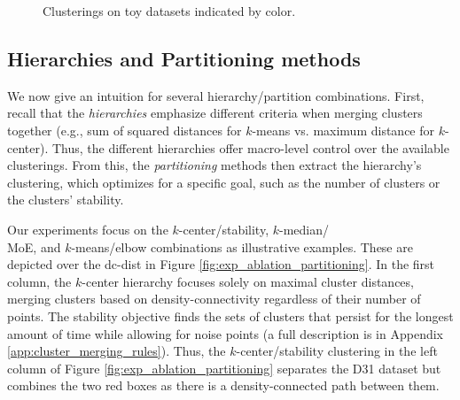 \begin{figure}[t]
    \centering
    \caption{Clusterings on toy datasets indicated by color.}
    \label{fig:exp_adapt}
\end{figure}



\subsection{Hierarchies and Partitioning methods}\label{ssec:partitioning}


We now give an intuition for several hierarchy/partition combinations. First, recall that the \emph{hierarchies} emphasize different criteria when merging clusters together (e.g., sum of squared distances for $k$-means vs. maximum distance for $k$-center). Thus, the different hierarchies offer macro-level control over the available clusterings. From this, the \textit{partitioning} methods then extract the hierarchy's clustering, which optimizes for a specific goal, such as the number of clusters or the clusters' stability.



Our experiments focus on the $k$-center/stability, $k$-median/\\MoE, and $k$-means/elbow combinations as illustrative examples. These are depicted over the dc-dist in Figure \ref{fig:exp_ablation_partitioning}. In the first column, the $k$-center hierarchy focuses solely on maximal cluster distances, merging clusters based on density-connectivity regardless of their number of points. The stability objective finds the sets of clusters that persist for the longest amount of time while allowing for noise points (a full description is in Appendix \ref{app:cluster_merging_rules}). Thus, the $k$-center/stability clustering in the left column of Figure \ref{fig:exp_ablation_partitioning} separates the D31 dataset but combines the two red boxes as there is a density-connected path between them.

